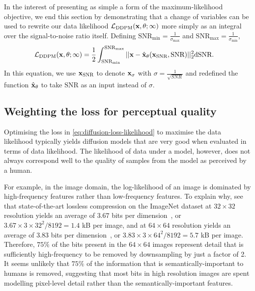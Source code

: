 In the interest of presenting as simple a form of the maximum-likelihood objective, we end this section by demonstrating that a change of variables can be used to rewrite our data likelihood $\mathcal{L}_\text{DDPM}({\mathbf{x}}, \theta; \infty)$ more simply as an integral over the signal-to-noise ratio itself. Defining $\text{SNR}_\text{min} = \frac{1}{\sigma_\text{max}}$ and $\text{SNR}_\text{max} = \frac{1}{\sigma_\text{min}}$,
\begin{align}
    \mathcal{L}_\text{DDPM}({\mathbf{x}}, \theta; \infty) &= \frac{1}{2} \int_{\text{SNR}_\text{min}}^{\text{SNR}_\text{max}} || {\mathbf{x}} - \hat{{\mathbf{x}}}_\theta({\mathbf{x}}_\text{SNR}, \text{SNR}) ||_2^2 \mathrm{d}\text{SNR}. \label{eq:diffusion-integral-dsnr}
\end{align}
In this equation, we use ${\mathbf{x}}_\text{SNR}$ to denote ${\mathbf{x}}_\sigma$ with $\sigma = \frac{1}{\sqrt{SNR}}$ and redefined the function $\hat{{\mathbf{x}}}_\theta$ to take $\text{SNR}$ as an input instead of $\sigma$.


\subsection{Weighting the loss for perceptual quality} \label{sec:diffusion-perceptual-quality}
Optimising the loss in \cref{eq:diffusion-loss-likelihood} to maximise the data likelihood typically yields diffusion models that are very good when evaluated in terms of data likelihood. The likelihood of data under a model, however, does not always correspond well to the quality of samples from the model as perceived by a human. 

For example, in the image domain, the log-likelihood of an image is dominated by high-frequency features rather than low-frequency features. To explain why, see that state-of-the-art lossless compression on the ImageNet dataset at $32\times32$ resolution yields an average of $3.67$ bits per dimension~\citep{sahoo2023diffusion}, or $3.67\times3\times32^2 / 8192 = 1.4$ kB per image, and at $64\times64$ resolution yields an average of 3.83 bits per dimension~\citep{finlay2020train}, or $3.83\times3\times64^2 / 8192 = 5.7$ kB per image. Therefore, $75\%$ of the bits present in the $64\times64$ images represent detail that is sufficiently high-frequency to be removed by downsampling by just a factor of 2. It seems unlikely that $75\%$ of the information that is semantically-important to humans is removed, suggesting that most bits in high resolution images are spent modelling pixel-level detail rather than the semantically-important features.

